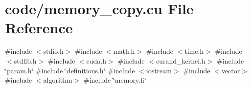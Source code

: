\hypertarget{memory__copy_8cu}{}\section{code/memory\+\_\+copy.cu File Reference}
\label{memory__copy_8cu}
{\ttfamily \#include $<$stdio.\+h$>$}\newline
{\ttfamily \#include $<$math.\+h$>$}\newline
{\ttfamily \#include $<$time.\+h$>$}\newline
{\ttfamily \#include $<$stdlib.\+h$>$}\newline
{\ttfamily \#include $<$cuda.\+h$>$}\newline
{\ttfamily \#include $<$curand\+\_\+kernel.\+h$>$}\newline
{\ttfamily \#include \char`\"{}param.\+h\char`\"{}}\newline
{\ttfamily \#include \char`\"{}definitions.\+h\char`\"{}}\newline
{\ttfamily \#include $<$iostream$>$}\newline
{\ttfamily \#include $<$vector$>$}\newline
{\ttfamily \#include $<$algorithm$>$}\newline
{\ttfamily \#include \char`\"{}memory.\+h\char`\"{}}\newline
